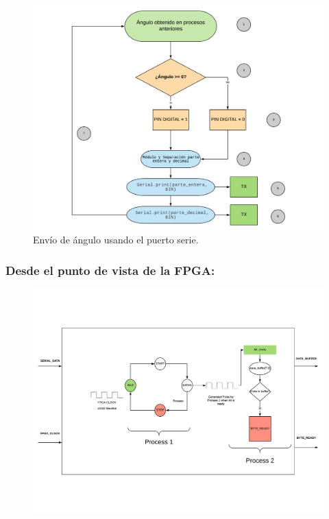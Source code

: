 \begin{figure}[H]
	\center
	\includegraphics[trim = 0mm 0mm 0mm 0mm, clip,scale=0.7]{imagenes/Balancing_robot/extraccion_angulo.pdf}
	\caption{Envío de ángulo usando el puerto serie.}
	\label{fig:extraccion_angulo}
\end{figure}

\subsubsection{Desde el punto de vista de la FPGA:}
\begin{center}
	\begin{figure}[H]
		\center
		\includegraphics[trim = 0mm 0mm 0mm 10mm, clip,scale=0.9, angle=90]{imagenes/Balancing_robot/arduino_interfacefluid.pdf}
		\label{fig:arduino_interfacefluid}
	\end{figure}
\end{center}

